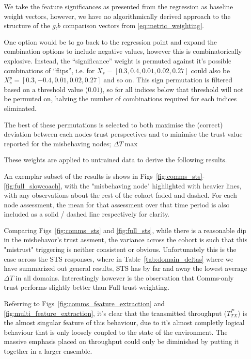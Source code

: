 \documentclass{aamas2016}
\begin{document}
We take the feature significances as presented from the regression as baseline weight vectors, however, we have no algorithmically derived approach to the structure of the $g$,$b$ comparison vectors from \eqref{eq:metric_weighting}.

One option would be to go back to the regression point and expand the combination options to include negative values, however this is combinatorically explosive.
Instead, the ``significance'' weight is permuted against it's possible combinations of ``flips'', i.e. for $X_s=[0.3,0.4,0.01,0.02,0.27]$ could also be $X_s^p=[0.3,-0.4,0.01,0.02,0.27]$ and so on. 
This sign permutation is filtered based on a threshold value ($0.01$), so for all indices below that threshold will not be permuted on, halving the number of combinations required for each indices eliminated.

The best of these permutations is selected to both maximise the (correct) deviation between each nodes trust perspectives and to minimise the trust value reported for the misbehaving nodes; $\Delta T \max$

These weights are applied to untrained data to derive the following results.

An exemplar subset of the results is shows in Figs~\ref{fig:comms_sts}-\ref{fig:full_slowcoach}, with the "misbehaving node" highlighted with heavier lines, with any observations about the rest of the cohort faded and dashed. For each node assessment, the mean for that assessment over that time period is also included as a solid / dashed line respectively for clarity.

Comparing Figs~\ref{fig:comms_sts} and \ref{fig:full_sts}, while there is a reasonable dip in the misbehavor's trust assment, the variance across the cohort is such that this "mistrust" triggering is neither consistent or obvious. Unfortunately this is the case across the STS responses, where in Table~\ref{tab:domain_deltas} where we have summarized out general results, STS has by far and away the lowest average $\Delta T$ in all domains. Interestingly however is the observation that Comms-only trust performs slightly better than Full trust weighting.

Referring to Figs~\ref{fig:comms_feature_extraction} and \ref{fig:multi_feature_extraction}, it's clear that the transmitted throughput ($T^P_{TX}$) is the almost singular feature of this behaviour, due to it's almost completly logical behaviour that is only loosely coupled to the state of the environment. 
The massive emphasis placed on throughput could only be diminished by putting it together in a larger ensemble.
\end{document}
